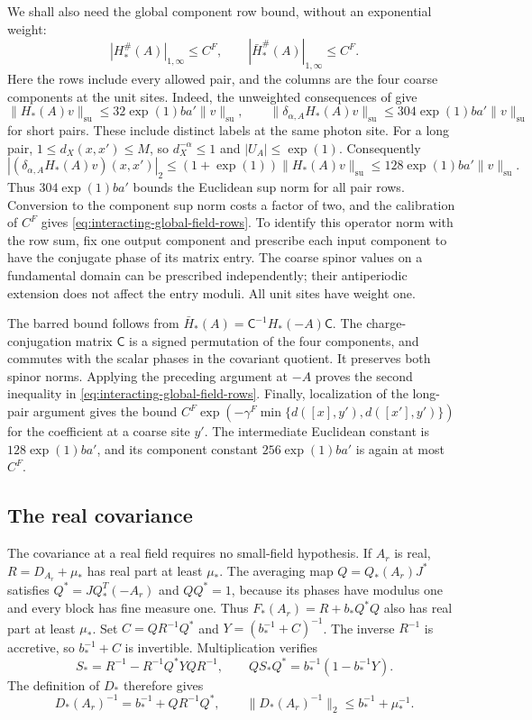 We shall also need the global component row
bound, without an exponential weight:
\begin{equation}\label{eq:interacting-global-field-rows}
 |H_*^\#(A)|_{1,\infty}\le C^F,\qquad
 |\bar H_*^\#(A)|_{1,\infty}\le C^F .
\end{equation}
Here the rows include every allowed pair, and
the columns are the four coarse components
at the unit sites. Indeed, the unweighted
consequences of \cite[(43)]{FermionBlock}
give
\[
 \|H_*(A)v\|_{\mathrm{su}}
       \le32\exp(1)ba'\|v\|_{\mathrm{su}},\qquad
 \|\delta_{\alpha,A}H_*(A)v\|_{\mathrm{su}}
       \le304\exp(1)ba'\|v\|_{\mathrm{su}}
\]
for short pairs. These include distinct
labels at the same photon site.
For a long pair, $1\le d_X(x,x')\le M$,
so $d_X^{-\alpha}\le1$ and $|U_A|\le\exp(1)$.
Consequently
\[
 |(\delta_{\alpha,A}H_*(A)v)(x,x')|_2
 \le(1+\exp(1))\|H_*(A)v\|_{\mathrm{su}}
 \le128\exp(1)ba'\|v\|_{\mathrm{su}} .
\]
Thus $304\exp(1)ba'$ bounds the Euclidean
sup norm for all pair rows. Conversion to
the component sup norm costs a factor of
two, and the calibration of $C^F$ gives
\eqref{eq:interacting-global-field-rows}.
To identify this operator norm with the row
sum, fix one output component and prescribe
each input component to have the conjugate
phase of its matrix entry. The coarse
spinor values on a fundamental domain can
be prescribed independently; their
antiperiodic extension does not affect
the entry moduli. All unit sites have
weight one.

The barred bound follows from
$\bar H_*(A)=\mathsf C^{-1}H_*(-A)\mathsf C$.
The charge-conjugation matrix $\mathsf C$
is a signed permutation of the four
components, and commutes with the scalar
phases in the covariant quotient. It
preserves both spinor norms. Applying
the preceding argument at $-A$ proves
the second inequality in
\eqref{eq:interacting-global-field-rows}.
Finally, localization of the long-pair
argument gives the bound
$C^F\exp(-\gamma^F\min\{d([x],y'),d([x'],y')\})$
for the coefficient at a coarse site $y'$.
The intermediate Euclidean constant is
$128\exp(1)ba'$, and its component constant
$256\exp(1)ba'$ is again at most $C^F$.

\subsection{The real covariance}
\label{subsec:interacting-covariance}

The covariance at a real field requires no
small-field hypothesis. If $A_r$ is real,
$R=D_{A_r}+\mu_*$ has real part at least $\mu_*$.
The averaging map $Q=Q_*(A_r)J^*$ satisfies
$Q^*=JQ_*^T(-A_r)$ and $QQ^*=1$, because its
phases have modulus one and every block has
fine measure one. Thus $F_*(A_r)=R+b_*Q^*Q$
also has real part at least $\mu_*$.
Set $C=QR^{-1}Q^*$ and $Y=(b_*^{-1}+C)^{-1}$.
The inverse $R^{-1}$ is accretive, so
$b_*^{-1}+C$ is invertible. Multiplication
verifies
\[
 S_*=R^{-1}-R^{-1}Q^*YQR^{-1},\qquad
 Q S_*Q^*=b_*^{-1}(1-b_*^{-1}Y).
\]
The definition of $D_*$ therefore gives
\begin{equation}\label{eq:interacting-coarse-covariance}
 D_*(A_r)^{-1}=b_*^{-1}+QR^{-1}Q^*,\qquad
 \|D_*(A_r)^{-1}\|_2\le b_*^{-1}+\mu_*^{-1}.
\end{equation}

